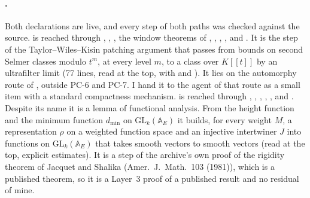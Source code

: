 \documentclass[11pt]{article}
\newcommand{\PC}[1]{\textsf{PC-#1}}
\theoremstyle{remark}
\begin{document}
\paragraph{.} Both declarations are live, and every step of both paths was checked against the source.  is reached through , , , the window theorems of , , , ,  and . It is the step of the Taylor--Wiles--Kisin patching argument that passes from bounds on second Selmer classes modulo $t^m$, at every level $m$, to a class over $K[[t]]$ by an ultrafilter limit (77 lines, read at the top, with  and ). It lies on the automorphy route of , outside \PC{6} and \PC{7}. I hand it to the agent of that route as a small item with a standard compactness mechanism.  is reached through , , , , ,  and . Despite its name it is a lemma of functional analysis. From the height function and the minimum function $d_{\min}$ on $\mathrm{GL}_k(\mathbb A_E)$ it builds, for every weight $M$, a representation $\rho$ on a weighted function space and an injective intertwiner $J$ into functions on $\mathrm{GL}_k(\mathbb A_E)$ that takes smooth vectors to smooth vectors (read at the top, explicit estimates). It is a step of the archive's own proof of the rigidity theorem of Jacquet and Shalika (Amer.\ J.\ Math.\ 103 (1981)), which is a published theorem, so it is a Layer~3 proof of a published result and no residual of mine.
\end{document}
